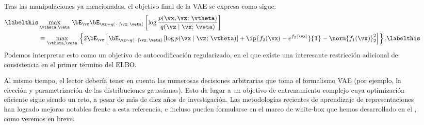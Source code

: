 \documentclass[../../book-main_es.tex]{subfiles}
\begin{document}
Tras las manipulaciones ya mencionadas, el objetivo final de la VAE se expresa como sigue:
\begin{align*}\labelthis\label{eq:elbo-objective}
    &\max_{\vtheta, \veta}\,
    \bE_{\vx}
    \bE_{\vz \sim q(\,\cdot\, \mid \vx ;\, \veta)} \left[
        \log \frac{p(\vx, \vz;\, \vtheta)}{q(\vz \mid \vx;\, \veta)}
    \right]\\
    &\equiv
    \max_{\vtheta, \veta}\,
    \left\{
        2\bE_{\vx}\left[
            \bE_{\vz \sim q(\,\cdot\, \mid \vx ;\, \veta)} \left[
                \log p(\vx \mid \vz;\, \vtheta)
            \right]
            + \ip{ f_2(\vx) - e^{f_2(\vx)}}{\mathbf{1}}
            - \norm{f_1(\vx)}_2^2
        \right]
    \right\}. \labelthis \label{eq:elbo-for-gaussians}
\end{align*}
Podemos interpretar esto como un objetivo de autocodificación regularizado, en el que existe
una interesante restricción adicional de consistencia en el primer término del ELBO.

Al mismo tiempo, el lector debería tener en cuenta las numerosas decisiones arbitrarias
que toma el formalismo VAE (por ejemplo, la elección y parametrización de las distribuciones gaussianas).
Esto da lugar a un objetivo de entrenamiento complejo cuya optimización eficiente sigue siendo
un reto, a pesar de más de diez años de investigación.
Las metodologías recientes de aprendizaje de representaciones han logrado mejoras notables frente a
esta referencia, e incluso pueden formularse en el marco de white-box que
hemos desarrollado en el , como veremos en breve.

\end{document}
